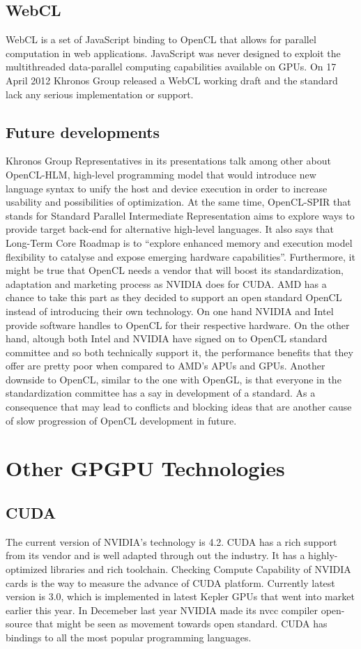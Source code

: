 \subsection{WebCL}
WebCL is a set of JavaScript binding to OpenCL that allows for parallel computation in web applications. JavaScript was never designed to exploit the multithreaded data-parallel computing capabilities available on GPUs. On 17 April 2012 Khronos Group released a WebCL working draft and the standard lack any serious implementation or support.

\subsection{Future developments}
Khronos Group Representatives in its presentations talk among other about OpenCL-HLM, high-level programming model that would introduce new language syntax to unify the host and device execution in order to increase usability and possibilities of optimization. At the same time, OpenCL-SPIR that stands for Standard Parallel Intermediate Representation aims to explore ways to provide target back-end for alternative high-level languages. It also says that Long-Term Core Roadmap is to \enquote{explore enhanced memory and execution model flexibility to catalyse and expose emerging hardware capabilities}. Furthermore, it might be true that OpenCL needs a vendor that will boost its standardization, adaptation and marketing process as NVIDIA does for CUDA. AMD has a chance to take this part as they decided to support an open standard OpenCL instead of introducing their own technology. On one hand NVIDIA and Intel provide software handles to OpenCL for their respective hardware. On the other hand, altough both Intel and NVIDIA have signed on to OpenCL standard committee and so both technically support it, the performance benefits that they offer are pretty poor when compared to AMD's APUs and GPUs. Another downside to OpenCL, similar to the one with OpenGL, is that everyone in the standardization committee has a say in development of a standard. As a consequence that may lead to conflicts and blocking ideas that are another cause of slow progression of OpenCL development in future.


\section{Other GPGPU Technologies}
\subsection{CUDA}
The current version of NVIDIA's technology is 4.2. CUDA has a rich support from its vendor and is well adapted through out the industry. It has a highly-optimized libraries and rich toolchain. Checking Compute Capability of NVIDIA cards is the way to measure the advance of CUDA platform. Currently latest version is 3.0, which is implemented in latest Kepler GPUs that went into market earlier this year. In Decemeber last year NVIDIA made its nvcc compiler open-source that might be seen as movement towards open standard. CUDA has bindings to all the most popular programming languages.

